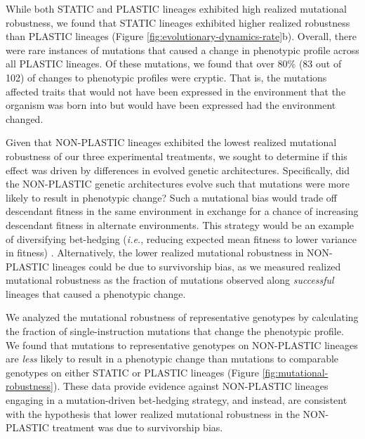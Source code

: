 While both STATIC and PLASTIC lineages exhibited high realized mutational robustness, we found that STATIC lineages exhibited higher realized robustness than PLASTIC lineages (Figure \ref{fig:evolutionary-dynamics-rate}b). 
Overall, there were rare instances of mutations that caused a change in phenotypic profile across all PLASTIC lineages.
Of these mutations, we found that over 80\% (83 out of 102) of changes to phenotypic profiles were cryptic. 
That is, the mutations affected traits that would not have been expressed in the environment that the organism was born into but would have been expressed had the environment changed.

%
%
%


Given that NON-PLASTIC lineages exhibited the lowest realized mutational robustness of our three experimental treatments, we sought to determine if this effect was driven by differences in evolved genetic architectures.
Specifically, did the NON-PLASTIC genetic architectures evolve such that mutations were more likely to result in phenotypic change?
Such a  mutational bias would trade off descendant fitness in the same environment in exchange for a chance of increasing descendant fitness in alternate environments.
This strategy would be an example of diversifying bet-hedging (\textit{i.e.}, reducing expected mean fitness to lower variance in fitness) \citep{childs2010evolutionary}.
Alternatively, the lower realized mutational robustness in NON-PLASTIC lineages could be due to survivorship bias, as we measured realized mutational robustness as the fraction of mutations observed along \textit{successful} lineages that caused a phenotypic change. 


We analyzed the mutational robustness of representative genotypes by calculating the fraction of single-instruction mutations that change the phenotypic profile.
We found that mutations to representative genotypes on NON-PLASTIC lineages are \textit{less} likely to result in a phenotypic change than mutations to comparable genotypes on either STATIC or PLASTIC lineages (Figure \ref{fig:mutational-robustness}).
These data provide evidence against NON-PLASTIC lineages engaging in a mutation-driven bet-hedging strategy, and instead, are consistent with the hypothesis that lower realized mutational robustness in the NON-PLASTIC treatment was due to survivorship bias.



